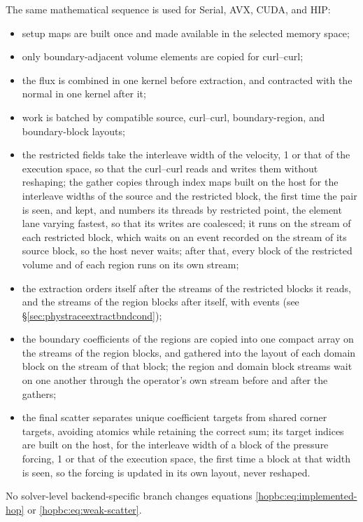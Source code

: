 The same mathematical sequence is used for Serial, AVX, CUDA, and HIP:
\begin{itemize}
  \item setup maps are built once and made available in the selected memory
        space;
  \item only boundary-adjacent volume elements are copied for curl--curl;
  \item the flux is combined in one kernel before extraction, and contracted
        with the normal in one kernel after it;
  \item work is batched by compatible source, curl--curl, boundary-region, and
        boundary-block layouts;
  \item the restricted fields take the interleave width of the velocity,
        1 or that of the execution space, so that the curl--curl reads and
        writes them without reshaping; the gather copies through index maps
        built on the host for the interleave widths of the source and the
        restricted block, the first time the pair is seen, and kept, and
        numbers its threads by restricted point, the element lane varying
        fastest, so that its writes are coalesced; it
        runs on the stream of each restricted block, which waits on an event
        recorded on the stream of its source block, so the host never waits;
        after that, every block of the restricted volume and of each region
        runs on its own stream;
  \item the extraction orders itself after the streams of the restricted
        blocks it reads, and the streams of the region blocks after itself,
        with events (see \S\ref{sec:phystraceextractbndcond});
  \item the boundary coefficients of the regions are copied into one
        compact array on the streams of the region blocks, and gathered into
        the layout of each domain block on the stream of that block; the
        region and domain block streams wait on one another through the
        operator's own stream before and after the gathers;
  \item the final scatter separates unique coefficient targets from shared
        corner targets, avoiding atomics while retaining the correct sum;
        its target indices are built on the host, for the interleave width
        of a block of the pressure forcing, 1 or that of the execution
        space, the first time a block at that width is seen, so the forcing
        is updated in its own layout, never reshaped.
\end{itemize}
No solver-level backend-specific branch changes equations
\eqref{hopbc:eq:implemented-hop} or \eqref{hopbc:eq:weak-scatter}.

